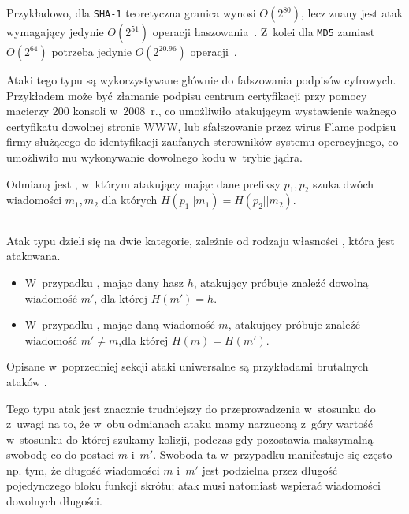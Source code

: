Przykładowo, dla \texttt{SHA-1} teoretyczna granica wynosi $O(2^{80})$, lecz
znany jest atak wymagający jedynie $O(2^{51})$ operacji
haszowania~\cite{best_sha1_collision_attack}. Z~kolei dla \texttt{MD5} zamiast
$O(2^{64})$ potrzeba jedynie $O(2^{20.96})$
operacji~\cite{best_md5_collision_attack}.

Ataki tego typu są wykorzystywane głównie do fałszowania podpisów cyfrowych.
Przykładem może być złamanie podpisu centrum certyfikacji przy pomocy macierzy
200 konsoli  w~2008~r.\cite{ps3_attack}, co umożliwiło
atakującym wystawienie ważnego certyfikatu dowolnej stronie WWW, lub
sfałszowanie przez wirus Flame podpisu firmy  służącego do
identyfikacji zaufanych sterowników systemu operacyjnego\cite{flame_attack}, co
umożliwiło mu wykonywanie dowolnego kodu w~trybie jądra.

Odmianą  jest ,
w~którym atakujący mając dane prefiksy $p_1, p_2$ szuka dwóch wiadomości $m_1,
m_2$ dla których $H(p_1 || m_1) = H(p_2 || m_2)$.


\subsection{}
Atak typu  dzieli się na dwie kategorie, zależnie od rodzaju
własności , która jest atakowana.
    \begin{itemize}

    \item W~przypadku , mając dany hasz $h$, atakujący
    próbuje znaleźć dowolną wiadomość $m'$, dla której $H(m') = h$.

    \item W~przypadku , mając daną wiadomość $m$,
    atakujący próbuje znaleźć wiadomość $m' \neq m$,dla której $H(m) = H(m')$.

    \end{itemize}
Opisane w~poprzedniej sekcji ataki uniwersalne są przykładami
brutalnych ataków .

Tego typu atak jest znacznie trudniejszy do przeprowadzenia w~stosunku do
 z~uwagi na to, że w~obu odmianach ataku mamy narzuconą
z~góry wartość w~stosunku do której szukamy kolizji, podczas gdy  pozostawia maksymalną swobodę co do postaci $m$ i~$m'$. Swoboda ta
w~przypadku  manifestuje się często np. tym, że długość
wiadomości $m$ i~$m'$ jest podzielna przez długość pojedynczego bloku funkcji
skrótu; atak  musi natomiast wspierać wiadomości dowolnych
długości.

